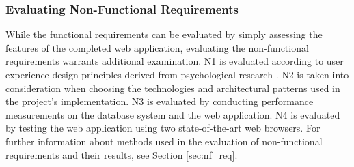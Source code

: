 \subsubsection{Evaluating Non-Functional Requirements}
While the functional requirements can be evaluated by simply assessing the features of the completed web application, evaluating the non-functional requirements warrants additional examination. N1 is evaluated according to user experience design principles derived from psychological research \cite{laws-of-ux}. N2 is taken into consideration when choosing the technologies and architectural patterns used in the project's implementation. N3 is evaluated by conducting performance measurements on the database system and the web application. N4 is evaluated by testing the web application using two state-of-the-art web browsers. For further information about methods used in the evaluation of non-functional requirements and their results, see Section \ref{sec:nf_req}.